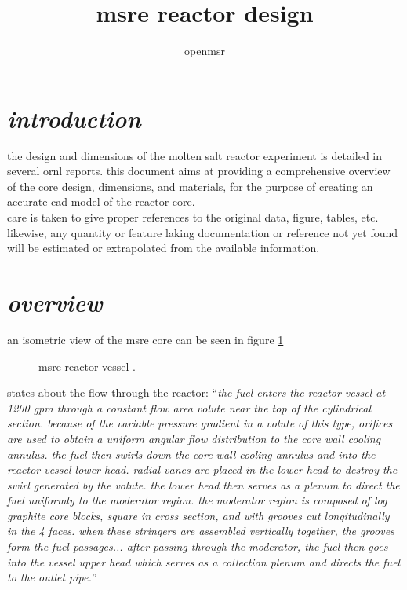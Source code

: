 \documentclass[ms,a4paper]{memoir}
\title{msre reactor design}
\author{openmsr}
\date{}
\newcommand*{\mrsarchive}{../../msr-archive}%
\begin{document}
\maketitle

\vspace{-4cm}
\renewcommand{\contentsname}{contents}
\tableofcontents*


\section{\emph{introduction}}
the design and dimensions of the molten salt reactor experiment is detailed in several ornl reports. this document aims at providing a comprehensive overview of the core design, dimensions, and materials, for the purpose of creating an accurate cad model of the reactor core. \\

care is taken to give proper references to the original data, figure, tables, etc. likewise, any quantity or feature laking documentation or reference not yet found will be estimated or extrapolated from the available information.



\section{\emph{overview}}
an isometric view of the msre core can be seen in figure \ref{3229-fig1}
\begin{figure}[H]
  \centering
  \caption{msre reactor vessel \parencite[figure 1]{ornl-tm-3229}.}
  \label{3229-fig1}
\end{figure}

\textcite[page 1]{ornl-tm-3229} states about the flow through the reactor:
\enquote{\textit{the fuel enters the reactor vessel at 1200 gpm through a constant flow area volute near the top of the cylindrical section. because of the variable pressure gradient in a volute of this type, orifices are used to obtain a uniform angular flow distribution to the core wall cooling annulus. the fuel then swirls down the core wall cooling annulus and into the reactor vessel lower head. radial vanes are placed in the lower head to destroy the swirl generated by the volute. the lower head then serves as a plenum to direct the fuel uniformly to the moderator region. the moderator region is composed of log graphite core blocks, square in cross section, and with grooves cut longitudinally in the 4 faces. when these stringers are assembled vertically together, the grooves form the fuel passages... after passing through the moderator, the fuel then goes into the vessel upper head which serves as a collection plenum and directs the fuel to the outlet pipe.}}
\end{document}
